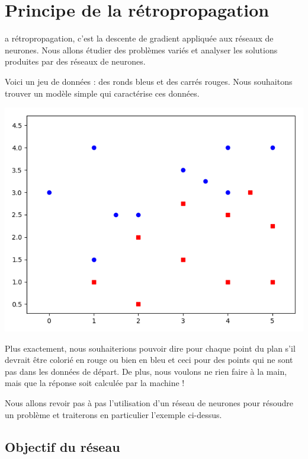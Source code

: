 \section{Principe de la rétropropagation}

{a rétropropagation, c'est la descente de gradient appliquée aux réseaux de neurones. Nous allons étudier des problèmes variés et analyser les solutions produites par des réseaux de neurones.
	
Voici un jeu de données : des ronds bleus et des carrés rouges.
Nous souhaitons trouver un modèle simple qui caractérise ces données.


\begin{center}
	\includegraphics[scale=\myscale,scale=0.5]{figures/retro_01_a}
\end{center}

Plus exactement, nous souhaiterions pouvoir dire pour chaque point du plan s'il devrait être colorié en rouge ou bien en bleu et ceci pour des points qui ne sont pas dans les données de départ. De plus, nous voulons ne rien faire à la main, mais que la réponse soit calculée par la machine !

Nous allons revoir pas à pas l'utilisation d'un réseau de neurones pour résoudre un problème et traiterons en particulier l'exemple ci-dessus.

\subsection{Objectif du réseau}

}
